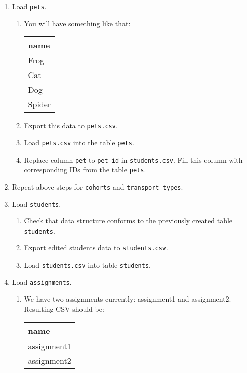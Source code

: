 \documentclass[12pt]{article}
\newcommand{\code}[1]{\texttt{#1}}
\begin{document}
\begin{enumerate}
\item Load \code{pets}.

\begin{enumerate}
\item You will have something like that:

\begin{tabular}{| l | }
  \hline
  \textbf{name}  \\
  \hline
  Frog \\
  Cat \\
  Dog \\
  Spider \\
  \hline
\end{tabular}

\item Export this data to \code{pets.csv}.
\item Load \code{pets.csv} into the table \code{pets}.
\item Replace column \code{pet} to \code{pet\_id} in \code{students.csv}. Fill this column with corresponding IDs from the table \code{pets}.
\end{enumerate}

\item Repeat above steps for \code{cohorts} and \code{transport\_types}.

\item Load \code{students}.

\begin{enumerate}
\item Check that data structure conforms to the previously created table \code{students}.
\item Export edited students data to \code{students.csv}.
\item Load \code{students.csv} into table \code{students}.
\end{enumerate}

\item Load \code{assignments}.

\begin{enumerate}

\item We have two assignments currently: assignment1 and assignment2. Resulting CSV should be:

\begin{tabular}{| l | }
  \hline
  \textbf{name}  \\
  \hline
  assignment1 \\
  assignment2 \\
  \hline
\end{tabular}


\end{enumerate}
\end{enumerate}
\end{document}
